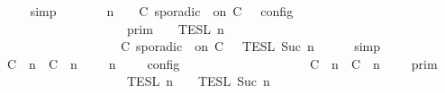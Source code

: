 \begin{isabellebody}
\ \ \ \ \isamarkupfalse%
\ simp\isanewline
\ \ \isamarkupfalse%
\ \isamarkupfalse%
\ {\isacartoucheopen}{\isasymlbrakk}\ {\isasymGamma}{\isacharcomma}\ n\ {\isasymTurnstile}\ {\isasymPsi}\ {\isasymtriangleright}\ {\isacharparenleft}{\isacharparenleft}C\ sporadic\ {\isasymtau}\ on\ C\ {\isacharhash}\ {\isasymPhi}{\isacharparenright}\ {\isasymrbrakk}\isactrlsub c\isactrlsub o\isactrlsub n\isactrlsub f\isactrlsub i\isactrlsub g\isanewline
\ \ \ \ \ \ \ \ \ \ \ \ \ \ \ \ \ {\isacharequal}\ \ {\isasymlbrakk}{\isasymlbrakk}\ {\isasymGamma}\ {\isasymrbrakk}{\isasymrbrakk}\isactrlsub p\isactrlsub r\isactrlsub i\isactrlsub m\ {\isasyminter}\ {\isasymlbrakk}{\isasymlbrakk}\ {\isasymPsi}\ {\isasymrbrakk}{\isasymrbrakk}\isactrlsub T\isactrlsub E\isactrlsub S\isactrlsub L\isactrlbsup {\isasymge}\ n\isactrlesup \isanewline
\ \ \ \ \ \ \ \ \ \ \ \ \ \ \ \ \ \ {\isasyminter}\ {\isasymlbrakk}{\isasymlbrakk}\ {\isacharparenleft}C\ sporadic\ {\isasymtau}\ on\ C\ {\isacharhash}\ {\isasymPhi}\ {\isasymrbrakk}{\isasymrbrakk}\isactrlsub T\isactrlsub E\isactrlsub S\isactrlsub L\isactrlbsup {\isasymge}\ Suc\ n\isactrlesup {\isacartoucheclose}\isanewline
\ \ \ \ \isamarkupfalse%
\ simp\isanewline
\ \ \isamarkupfalse%
\ \isamarkupfalse%
\ {\isacartoucheopen}{\isasymlbrakk}\ {\isacharparenleft}{\isacharparenleft}C\ {\isasymUp}\ n{\isacharparenright}\ {\isacharhash}\ {\isacharparenleft}C\ {\isasymDown}\ n\ {\isacharat}\ {\isasymtau}{\isacharparenright}\ {\isacharhash}\ {\isasymGamma}{\isacharparenright}{\isacharcomma}\ n\ {\isasymTurnstile}\ {\isasymPsi}\ {\isasymtriangleright}\ {\isasymPhi}\ {\isasymrbrakk}\isactrlsub c\isactrlsub o\isactrlsub n\isactrlsub f\isactrlsub i\isactrlsub g\isanewline
\ \ \ \ \ \ \ \ \ \ \ \ \ \ \ \ \ {\isacharequal}\ \ {\isasymlbrakk}{\isasymlbrakk}\ {\isacharparenleft}{\isacharparenleft}C\ {\isasymUp}\ n{\isacharparenright}\ {\isacharhash}\ {\isacharparenleft}C\ {\isasymDown}\ n\ {\isacharat}\ {\isasymtau}{\isacharparenright}\ {\isacharhash}\ {\isasymGamma}{\isacharparenright}\ {\isasymrbrakk}{\isasymrbrakk}\isactrlsub p\isactrlsub r\isactrlsub i\isactrlsub m\isanewline
\ \ \ \ \ \ \ \ \ \ \ \ \ \ \ \ \ \ {\isasyminter}\ {\isasymlbrakk}{\isasymlbrakk}\ {\isasymPsi}\ {\isasymrbrakk}{\isasymrbrakk}\isactrlsub T\isactrlsub E\isactrlsub S\isactrlsub L\isactrlbsup {\isasymge}\ n\isactrlesup \ {\isasyminter}\ {\isasymlbrakk}{\isasymlbrakk}\ {\isasymPhi}\ {\isasymrbrakk}{\isasymrbrakk}\isactrlsub T\isactrlsub E\isactrlsub S\isactrlsub L\isactrlbsup {\isasymge}\ Suc\ n\isactrlesup {\isacartoucheclose}\isanewline

\end{isabellebody}
